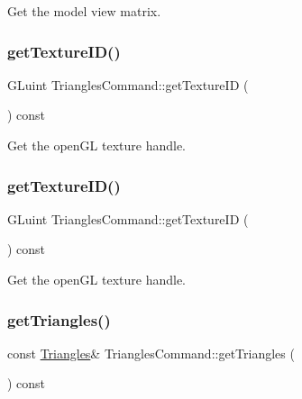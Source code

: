 Get the model view matrix. \mbox{\label{classTrianglesCommand_a0d523d41e7121d400395a1d30d97ded2}} 
\subsubsection{\texorpdfstring{get\+Texture\+I\+D()}{getTextureID()}\hspace{0.1cm}{\footnotesize\ttfamily [1/2]}}
{\footnotesize\ttfamily G\+Luint Triangles\+Command\+::get\+Texture\+ID (\begin{DoxyParamCaption}{ }\end{DoxyParamCaption}) const\hspace{0.3cm}{\ttfamily [inline]}}

Get the open\+GL texture handle. \mbox{\label{classTrianglesCommand_a0d523d41e7121d400395a1d30d97ded2}} 
\subsubsection{\texorpdfstring{get\+Texture\+I\+D()}{getTextureID()}\hspace{0.1cm}{\footnotesize\ttfamily [2/2]}}
{\footnotesize\ttfamily G\+Luint Triangles\+Command\+::get\+Texture\+ID (\begin{DoxyParamCaption}{ }\end{DoxyParamCaption}) const\hspace{0.3cm}{\ttfamily [inline]}}

Get the open\+GL texture handle. \mbox{\label{classTrianglesCommand_a6800ca337954a12e6ad0cf1f08ec0ec9}} 
\subsubsection{\texorpdfstring{get\+Triangles()}{getTriangles()}\hspace{0.1cm}{\footnotesize\ttfamily [1/2]}}
{\footnotesize\ttfamily const \hyperlink{structTrianglesCommand_1_1Triangles}{Triangles}\& Triangles\+Command\+::get\+Triangles (\begin{DoxyParamCaption}{ }\end{DoxyParamCaption}) const\hspace{0.3cm}{\ttfamily [inline]}}

